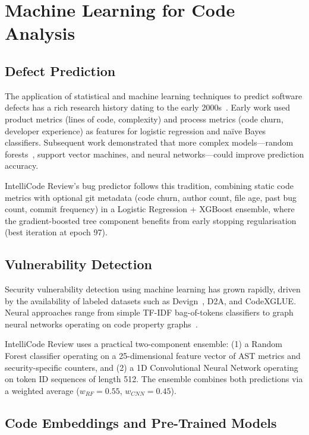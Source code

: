 \documentclass[12pt, oneside]{report}
\begin{document}
\section{Machine Learning for Code Analysis}
\label{sec:bg-ml}

\subsection{Defect Prediction}

The application of statistical and machine learning techniques to predict software defects
has a rich research history dating to the early 2000s~\cite{nagappan2005, zimmermann2007}.
Early work used product metrics (lines of code, complexity) and process metrics (code churn,
developer experience) as features for logistic regression and na\"ive Bayes classifiers.
Subsequent work demonstrated that more complex models---random forests~\cite{lessmann2008},
support vector machines, and neural networks---could improve prediction accuracy.

IntelliCode Review's bug predictor follows this tradition, combining static code metrics
with optional git metadata (code churn, author count, file age, past bug count, commit
frequency) in a Logistic Regression + XGBoost ensemble, where the gradient-boosted tree
component benefits from early stopping regularisation (best iteration at epoch 97).

\subsection{Vulnerability Detection}

Security vulnerability detection using machine learning has grown rapidly, driven by
the availability of labeled datasets such as Devign~\cite{zhou2019}, D2A, and CodeXGLUE.
Neural approaches range from simple TF-IDF bag-of-tokens classifiers to graph neural
networks operating on code property graphs~\cite{yamaguchi2014}.

IntelliCode Review uses a practical two-component ensemble: (1) a Random Forest classifier
operating on a 25-dimensional feature vector of AST metrics and security-specific counters,
and (2) a 1D Convolutional Neural Network operating on token ID sequences of length 512.
The ensemble combines both predictions via a weighted average ($w_{RF}=0.55$, $w_{CNN}=0.45$).

\subsection{Code Embeddings and Pre-Trained Models}
\end{document}
